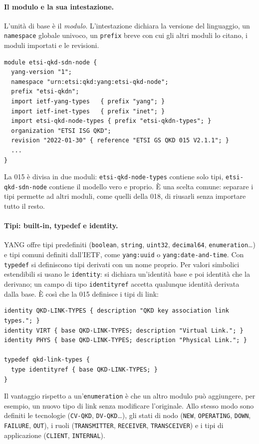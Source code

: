 \paragraph{Il modulo e la sua intestazione.}
L'unità di base è il \emph{modulo}. L'intestazione dichiara la versione
del linguaggio, un \texttt{namespace} globale univoco, un \texttt{prefix}
breve con cui gli altri moduli lo citano, i moduli importati e le revisioni.
\begin{lstlisting}[language=yang]
module etsi-qkd-sdn-node {
  yang-version "1";
  namespace "urn:etsi:qkd:yang:etsi-qkd-node";
  prefix "etsi-qkdn";
  import ietf-yang-types   { prefix "yang"; }
  import ietf-inet-types   { prefix "inet"; }
  import etsi-qkd-node-types { prefix "etsi-qkdn-types"; }
  organization "ETSI ISG QKD";
  revision "2022-01-30" { reference "ETSI GS QKD 015 V2.1.1"; }
  ...
}
\end{lstlisting}
La 015 è divisa in due moduli: \texttt{etsi-qkd-node-types} contiene solo
tipi, \texttt{etsi-qkd-sdn-node} contiene il modello vero e proprio. È una
scelta comune: separare i tipi permette ad altri moduli, come quelli della
018, di riusarli senza importare tutto il resto.

\paragraph{Tipi: built-in, typedef e identity.}
YANG offre tipi predefiniti (\texttt{boolean}, \texttt{string},
\texttt{uint32}, \texttt{decimal64}, \texttt{enumeration}\dots) e tipi
comuni definiti dall'IETF, come \texttt{yang:uuid} o
\texttt{yang:date-and-time}. Con \texttt{typedef} si definiscono tipi
derivati con un nome proprio. Per valori simbolici estendibili si usano le
\texttt{identity}: si dichiara un'identità base e poi identità che la
derivano; un campo di tipo \texttt{identityref} accetta qualunque identità
derivata dalla base. È così che la 015 definisce i tipi di link:
\begin{lstlisting}[language=yang]
identity QKD-LINK-TYPES { description "QKD key association link types."; }
identity VIRT { base QKD-LINK-TYPES; description "Virtual Link."; }
identity PHYS { base QKD-LINK-TYPES; description "Physical Link."; }

typedef qkd-link-types {
  type identityref { base QKD-LINK-TYPES; }
}
\end{lstlisting}
Il vantaggio rispetto a un'\texttt{enumeration} è che un altro modulo può
aggiungere, per esempio, un nuovo tipo di link senza modificare l'originale.
Allo stesso modo sono definiti le tecnologie (\texttt{CV-QKD},
\texttt{DV-QKD}\dots), gli stati di nodo (\texttt{NEW},
\texttt{OPERATING}, \texttt{DOWN}, \texttt{FAILURE}, \texttt{OUT}), i ruoli
(\texttt{TRANSMITTER}, \texttt{RECEIVER}, \texttt{TRANSCEIVER}) e i tipi
di applicazione (\texttt{CLIENT}, \texttt{INTERNAL}).

